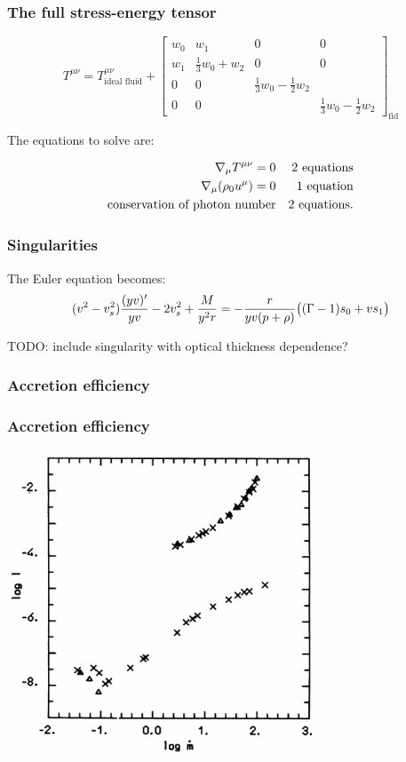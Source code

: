 \documentclass{beamer}
\begin{document}
\begin{frame}
    \frametitle{The full stress-energy tensor}

    \begin{equation*}
    T^{\mu\nu} =
    T^{\mu\nu}_{\text{ideal fluid}} +
    \begin{bmatrix}
    w_0   & w_1  & 0  & 0 \\
    w_1   & \frac{1}{3}w_0 + w_2  &  0  & 0 \\
      0 & 0  &  \frac{1}{3}w_0 -\frac{1}{2}w_2 &  \\
      0 & 0  &   & \frac{1}{3}w_0 -\frac{1}{2}w_2
    \end{bmatrix} _{\text{fid}}
    \end{equation*}

    The equations to solve are:

    \begin{subequations}
    \begin{align*}
      \nabla_\mu T^{\mu\nu} = 0 && \text{2 equations} \\
      \nabla_\mu \qty(\rho_0 u^\mu) = 0&& \text{1 equation} \\
      \text{conservation of photon number} && \text{2 equations.}
    \end{align*}
    \end{subequations}
\end{frame}

\begin{frame}
    \frametitle{Singularities}
    The Euler equation becomes:
        \begin{equation*}
        (v^2 - v_s^2) \frac{(yv) ^{\prime}}{yv} - 2 v_s^2 + \frac{M}{y^2 r}
        = -\frac{r}{yv (p + \rho)} \qty((\Gamma-1)s_0 + v s_1)
        \end{equation*}

    TODO: include singularity with optical thickness dependence?
\end{frame}

\begin{frame}
    \frametitle{Accretion efficiency}


\end{frame}

\begin{frame}
    \frametitle{Accretion efficiency}
    \centering
    \includegraphics[width=0.7\textwidth]{../figures/logl-logm}
\end{frame}
\end{document}
